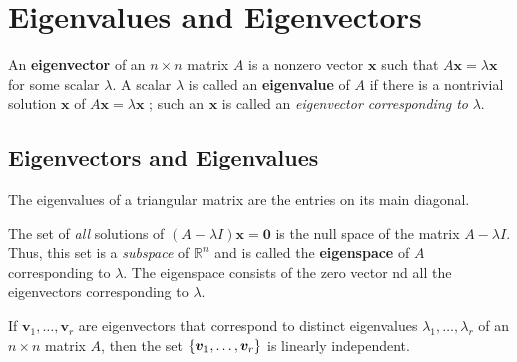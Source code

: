 \documentclass[11pt]{scrartcl}
\theoremstyle{dotlessP}
\theoremstyle{dotlessN}
\DeclarePairedDelimiter\set{\{}{\}}
\newcommand{\reals}{\mathbb{R}} %
\begin{document}
\section{Eigenvalues and Eigenvectors}
\begin{definition}
	An \textbf{eigenvector} of an $n \times n$ matrix $A$ is a nonzero vector $\bm{x}$ such that $A\bm{x} = \lambda \bm{x}$ for some scalar $\lambda$. A scalar $\lambda$ is called an \textbf{eigenvalue} of $A$ if there is a nontrivial solution $\bm{x} $ of $A\bm{x} = \lambda\bm{x}$ ; such an $\bm{x}$ is called an \textit{eigenvector corresponding to} $\lambda$.
\end{definition}
\subsection{Eigenvectors and Eigenvalues}
\begin{theorem}
	The eigenvalues of a triangular matrix are the entries on its main diagonal.
\end{theorem}
\begin{definition}
	The set of \textit{all} solutions of $(A-\lambda I)\bm{x} = \bm{0}$ is the null space of the matrix $A - \lambda I$. Thus, this set is a \textit{subspace} of $\reals^n$ and is called the \textbf{eigenspace} of  $A$ corresponding to $\lambda$. The eigenspace consists of the zero vector nd all the eigenvectors corresponding to $\lambda$.
\end{definition}
\begin{theorem}
	If $\bm{v}_1, \dots, \bm{v}_r$ are eigenvectors that correspond to distinct eigenvalues $\lambda_1, \dots, \lambda_r$ of an $n \times n$ matrix $A$, then the set $\set*{\bm{v}_1, \dots, \bm{v}_r}$ is linearly independent.
\end{theorem}
\end{document}
